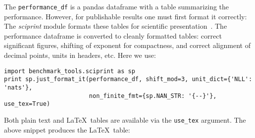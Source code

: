 \documentclass{article}
\newcommand{\code}{\texttt}
\begin{document}
The \code{performance\_df} is a pandas dataframe with a table summarizing the performance.
However, for publishable results one must first format it correctly:
The \emph{sciprint} module formats these tables for scientific presentation~\citep{Cole2015}.
The performance dataframe is converted to cleanly formatted tables: correct significant figures, shifting of exponent for compactness, and correct alignment of decimal points, units in headers, etc.
Here we use:
\begin{verbatim}
import benchmark_tools.sciprint as sp
print sp.just_format_it(performance_df, shift_mod=3, unit_dict={'NLL': 'nats'},
                        non_finite_fmt={sp.NAN_STR: '{--}'}, use_tex=True)
\end{verbatim}
Both plain text and \LaTeX\ tables are available via the \code{use\_tex} argument.
The above snippet produces the \LaTeX\ table:\\
\end{document}
